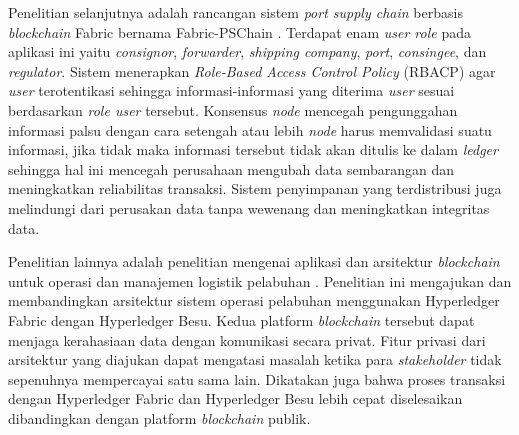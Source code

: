Penelitian selanjutnya adalah rancangan sistem \textit{port supply chain} berbasis \textit{blockchain} Fabric bernama Fabric-PSChain \citep{Gao2022}. Terdapat enam \textit{user role} pada aplikasi ini yaitu \textit{consignor}, \textit{forwarder}, \textit{shipping company}, \textit{port}, \textit{consingee}, dan \textit{regulator}. Sistem menerapkan \textit{Role-Based Access Control Policy} (RBACP) agar \textit{user} terotentikasi sehingga informasi-informasi yang diterima \textit{user} sesuai berdasarkan \textit{role user} tersebut. Konsensus \textit{node} mencegah pengunggahan informasi palsu dengan cara setengah atau lebih \textit{node} harus memvalidasi suatu informasi, jika tidak maka informasi tersebut tidak akan ditulis ke dalam \textit{ledger} sehingga hal ini mencegah perusahaan mengubah data sembarangan dan meningkatkan reliabilitas transaksi. Sistem penyimpanan yang terdistribusi juga melindungi dari perusakan data tanpa wewenang dan meningkatkan integritas data.


Penelitian lainnya adalah penelitian mengenai aplikasi dan arsitektur \textit{blockchain} untuk operasi dan manajemen logistik pelabuhan \citep{Ahmad2021}. Penelitian ini mengajukan dan membandingkan arsitektur sistem operasi pelabuhan menggunakan Hyperledger Fabric dengan Hyperledger Besu. Kedua platform \textit{blockchain} tersebut dapat menjaga kerahasiaan data dengan komunikasi secara privat. Fitur privasi dari arsitektur yang diajukan dapat mengatasi masalah ketika para \textit{stakeholder} tidak sepenuhnya mempercayai satu sama lain. Dikatakan juga bahwa proses transaksi dengan Hyperledger Fabric dan Hyperledger Besu lebih cepat diselesaikan dibandingkan dengan platform \textit{blockchain} publik.
